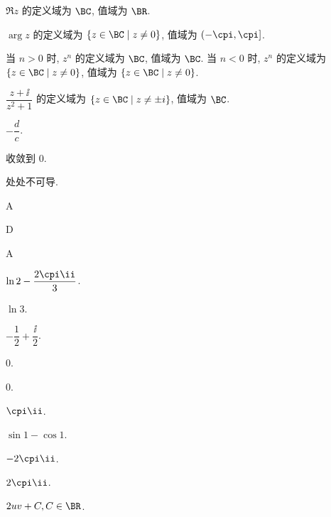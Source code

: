 \begin{multicols}{2}
\begin{exerciseanswer}
  \begin{enumnopar}[(i)]
    \item $\Re z$ 的定义域为 $\BC$, 值域为 $\BR$.
    \item $\arg z$ 的定义域为 $\{z\in\BC\mid z\neq 0\}$, 值域为 $(-\cpi,\cpi]$.
    \item 当 $n>0$ 时, $z^n$ 的定义域为 $\BC$, 值域为 $\BC$.
    当 $n<0$ 时, $z^n$ 的定义域为 $\{z\in\BC\mid z\neq 0\}$, 值域为 $\{z\in\BC\mid z\neq 0\}$.
    \item $\dfrac{z+\ii}{z^2+1}$ 的定义域为 $\{z\in\BC\mid z\neq \pm i\}$, 值域为 $\BC$.
  \end{enumnopar}
  \item $-\dfrac dc$.
  \item 收敛到 $0$.
\end{exerciseanswer}

\begin{exerciseanswer}
  \item 处处不可导.
  \item A
  \item D
  \item A
  \item $\ln 2-\dfrac{2\cpi\ii}3$.
  \item $\ln 3$.
\end{exerciseanswer}

\begin{exerciseanswer}
  \item $-\dfrac12+\dfrac\ii2$.
  \item \delspace\begin{enuminline}[(i)]
    \item $0$.
    \item $0$.
    \end{enuminline}
  \item $\cpi\ii$.
  \item $\sin1-\cos 1$.
  \item $-2\cpi\ii$.
  \item $2\cpi\ii$.
  \item $2uv+C,C\in\BR$.
\end{exerciseanswer}


\end{multicols}

